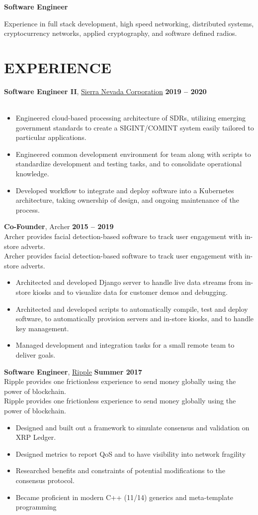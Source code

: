 \documentclass[10pt, center]{res} %
\newcommand{\pad}{\vspace{2pt}}
\newcommand{\unpad}{\vspace{-2pt}}
\newcommand{\bullets}[1]{
	\begin{itemize}[noitemsep]
		#1
	\end{itemize}
	\vspace{-6pt}
}
\newcommand{\experience}[5]{
	{\bf #1}, #2 \hfill {\bf #3} \\ \vspace{-10pt}
	\ifx\hfbuzz#4\hfbuzz
		\vspace{-4pt}
	\else
		{\vspace{-4pt} \\ #4}
	\fi
	\bullets{#5}
}
\begin{document}
\newcommand{\email}{\href{mailto:jmmcgee.00@gmail.com}{jmmcgee.00@gmail.com} }
\newcommand{\phone}{\href{tel:+1-323-557-8647}{(323) 557-8647} }
\address{\email | \phone}
\begin{resume}

\pad
\centerline{\textbf{\huge Software Engineer}}
\parbox{\textwidth}{
	Experience in full stack development, high speed networking, distributed systems, cryptocurrency networks, applied cryptography, and software defined radios.
}

\unpad
\section{EXPERIENCE}
	\experience {Software Engineer II}{\href{https://www.sncorp.com}{Sierra Nevada Corporation}}{2019 -- 2020}{}{
	\item Engineered cloud-based processing architecture of SDRs, utilizing emerging government standards to create a SIGINT/COMINT system easily tailored to particular applications.
	\item Engineered common development environment for team along with scripts to standardize development and testing tasks, and to consolidate operational knowledge.
	\item Developed workflow to integrate and deploy software into a Kubernetes architecture, taking ownership of design, and ongoing maintenance of the process.
	}

	\experience{Co-Founder}{Archer}{2015 -- 2019}{
	Archer provides facial detection-based software to track user engagement with in-store adverts.}{
		\item Architected and developed Django server to handle live data streams from in-store kiosks and to visualize data for customer demos and debugging.
		\item Architected and developed scripts to automatically compile, test and deploy software, to automatically provision servers and in-store kiosks, and to handle key management.
		\item Managed development and integration tasks for a small remote team to deliver goals.
	}

    \experience{Software Engineer}{\href{https://ripple.com/}{Ripple}}{Summer 2017}{
   	Ripple provides one frictionless experience to send money globally using the power of blockchain.}{
		\item Designed and built out a framework to simulate consensus and validation on XRP Ledger.
		\item Designed metrics to report QoS and  to have visibility into network fragility
		\item Researched benefits and constraints of potential modifications to the consensus protocol.
		\item Became proficient in modern C++ (11/14) generics and meta-template programming
    }


\end{resume}
\end{document}
